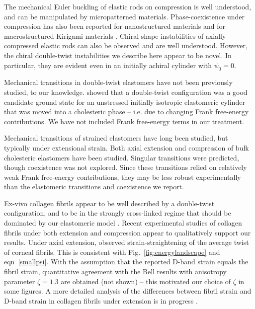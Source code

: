 \documentclass[twoside,twocolumn,9pt]{article}
\begin{document}
The mechanical Euler buckling of elastic rods on compression is well understood, and can be manipulated by micropatterned materials.\cite{Singamaneni:2010} Phase-coexistence under compression has also been reported for nanostructured materials \cite{Rey:2016} and for macrostructured Kirigami materials \cite{Rafsanjani:2019}. Chiral-shape instabilities of axially compressed elastic rods can also be observed and are well understood.\cite{Miyazaki:1997} However, the chiral double-twist instabilities we describe here appear to be novel. In particular, they are evident even in an initially achiral cylinder with $\psi_0=0$.

Mechanical transitions in double-twist elastomers have not been previously studied, to our knowledge. \citet{Xing:2008} showed that a double-twist configuration was a good candidate ground state for an unstressed initially isotropic elastomeric cylinder that was moved into a cholesteric phase – i.e. due to changing Frank free-energy contributions. We have not included Frank free-energy terms in our treatment. 

Mechanical transitions of strained elastomers have long been studied, but 
typically under extensional strain.\cite{Mitchell:1993, Warner:1996, Warner:2000} Both axial extension \cite{Burridge:2006, Stille:2009} and compression \cite{Stille:2009} of bulk cholesteric elastomers have been studied. Singular transitions were predicted, though coexistence was not explored. Since these transitions relied on relatively weak Frank free-energy contributions, they may be less robust experimentally than the elastomeric transitions and coexistence we report.

Ex-vivo collagen fibrils appear to be well described by a double-twist configuration, and to be in the strongly cross-linked regime that should be dominated by our elastomeric model \cite{Leighton:2021a}. Recent experimental studies of collagen fibrils under both extension \cite{Bell:2018} and compression \cite{Peacock:2020} appear to qualitatively support our results. Under axial extension, \citet{Bell:2018} observed strain-straightening of the average twist of corneal fibrils. This is consistent with Fig.~\ref{fig:energylandscape} and eqn~\eqref{smallpsi}. With the assumption that the reported D-band strain equals the fibril strain, quantitative agreement with the Bell results with anisotropy parameter $\zeta =1.3$ are obtained (not shown) -- this motivated our choice of $\zeta$ in some figures. A more detailed analysis of the differences between fibril strain and D-band strain in collagen fibrils under extension is in progress \cite{Leighton:2021b}.
\end{document}
